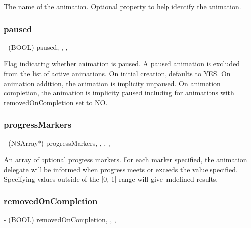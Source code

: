 The name of the animation.  Optional property to help identify the animation. \mbox{\label{interface_p_o_p_animation_a7ae9bf4e6d712c37d9e70e90079b96bd}} 
\subsubsection{\texorpdfstring{paused}{paused}}
{\footnotesize\ttfamily -\/ (B\+O\+OL) paused\hspace{0.3cm}{\ttfamily [read]}, {\ttfamily [write]}, {\ttfamily [nonatomic]}, {\ttfamily [assign]}}

Flag indicating whether animation is paused.  A paused animation is excluded from the list of active animations. On initial creation, defaults to Y\+ES. On animation addition, the animation is implicity unpaused. On animation completion, the animation is implicity paused including for animations with removed\+On\+Completion set to NO. \mbox{\label{interface_p_o_p_animation_a0934411549c858c08c34d8de25116437}} 
\subsubsection{\texorpdfstring{progress\+Markers}{progressMarkers}}
{\footnotesize\ttfamily -\/ (N\+S\+Array$\ast$) progress\+Markers\hspace{0.3cm}{\ttfamily [read]}, {\ttfamily [write]}, {\ttfamily [nonatomic]}, {\ttfamily [copy]}, {\ttfamily [implementation]}}

An array of optional progress markers. For each marker specified, the animation delegate will be informed when progress meets or exceeds the value specified. Specifying values outside of the \mbox{[}0, 1\mbox{]} range will give undefined results. \mbox{\label{interface_p_o_p_animation_a9a08ee39f86e903c893cb04ad4eb533d}} 
\subsubsection{\texorpdfstring{removed\+On\+Completion}{removedOnCompletion}}
{\footnotesize\ttfamily -\/ (B\+O\+OL) removed\+On\+Completion\hspace{0.3cm}{\ttfamily [read]}, {\ttfamily [write]}, {\ttfamily [nonatomic]}, {\ttfamily [assign]}}

